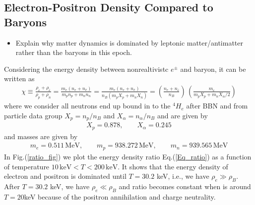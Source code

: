 \documentclass[Universe,article,submit,moreauthors,pdftex]{Definitions/mdpi}
\newcommand*{\xred}{\color{red}}
\begin{document}
\subsection{Electron-Positron Density Compared to Baryons}\label{subsec:ElectronPositronDensity}
\begin{itemize}
  \item {\xred Explain why matter dynamics is dominated by leptonic matter/antimatter rather than the baryons in this epoch.}
\end{itemize}
Considering the energy density between nonrealtivistc $e^\pm$ and baryon, it can be written as
\begin{align}\label{Eq_ratio}
\chi\equiv\frac{\rho_e+\rho_{\bar e}}{\rho_p+\rho_n}=\frac{m_e(n_e+n_{\bar e})}{m_pn_p+m_n n_n}=\frac{m_e(n_e+n_{\bar e})}{n_B(m_pX_p+m_nX_n)}=\left(\frac{n_e+n_{\bar e}}{n_B}\right)\,\left(\frac{m_e}{m_pX_p+{m_n X_\alpha}/2}\right)
\end{align}
where we consider all neutrons end up bound in to the $^4H_e$ after BBN  and from particle data group $X_p=n_p/n_B$ and $X_\alpha=n_\alpha/n_B$ and are given by
\begin{align}
X_p=0.878,\qquad X_\alpha=0.245
\end{align}
and masses are given by
\begin{align}
m_e=0.511\,\mathrm{MeV}, \qquad m_p=938.272\,\mathrm{MeV},\qquad m_n=939.565\,\mathrm{MeV}
\end{align}
In Fig.(\ref{ratio_fig}) we plot the energy density ratio Eq.(\ref{Eq_ratio}) as a function of temperature $10\,\mathrm{keV}< T<200\,\mathrm{keV}$. It shows that the energy density of electron and positron is dominated until $T=30.2$ keV, i.e.,  we have $\rho_{e}\gg\rho_B$. After $T=30.2$ keV, we have $\rho_{e}\ll\rho_B$ and ratio becomes constant when is around $T=20$keV because of the positron annihilation and charge neutrality.

\end{document}
